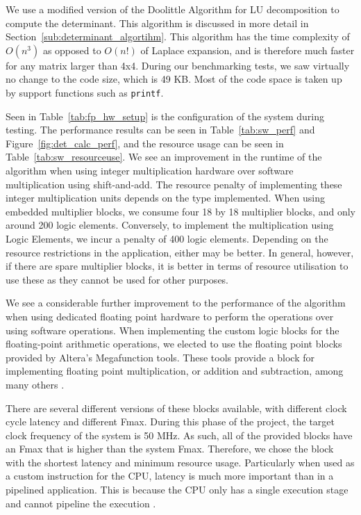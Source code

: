 \documentclass[]{article}
\begin{document}
We use a modified version of the Doolittle Algorithm for LU decomposition to compute the determinant. This algorithm is discussed in more detail in Section~\ref{sub:determinant_algortihm}.
This algorithm has the time complexity of $O(n^3)$ as opposed to $O(n!)$ of Laplace expansion, and is therefore much faster for any matrix larger than 4x4.
During our benchmarking tests, we saw virtually no change to the code size, which is 49 KB.
Most of the code space is taken up by support functions such as \verb"printf".

Seen in Table~\ref{tab:fp_hw_setup} is the configuration of the system during testing. The performance results can be seen in Table~\ref{tab:sw_perf} and Figure~\ref{fig:det_calc_perf}, and the resource usage can be seen in Table~\ref{tab:sw_resourceuse}.
We see an improvement in the runtime of the algorithm when using integer multiplication hardware over software multiplication using shift-and-add.
The resource penalty of implementing these integer multiplication units depends on the type implemented. When using embedded multiplier blocks, we consume four 18 by 18 multiplier blocks, and only around 200 logic elements.
Conversely, to implement the multiplication using Logic Elements, we incur a penalty of 400 logic elements.
Depending on the resource restrictions in the application, either may be better. In general, however, if there are spare multiplier blocks, it is better in terms of resource utilisation to use these as they cannot be used for other purposes.

We see a considerable further improvement to the performance of the algorithm when using dedicated floating point hardware to perform the operations over using software operations.
When implementing the custom logic blocks for the floating-point arithmetic operations, we elected to use the floating point blocks provided by Altera's Megafunction tools.
These tools provide a block for implementing floating point multiplication, or addition and subtraction, among many others \cite{megafunc}.

There are several different versions of these blocks available, with different clock cycle latency and different Fmax. During this phase of the project, the target clock frequency of the system is 50 MHz.
As such, all of the provided blocks have an Fmax that is higher than the system Fmax. Therefore, we chose the block with the shortest latency and minimum resource usage.
Particularly when used as a custom instruction for the CPU, latency is much more important than in a pipelined application. This is because the CPU only has a single execution stage and cannot pipeline the execution \cite{Nios}.
\end{document}
